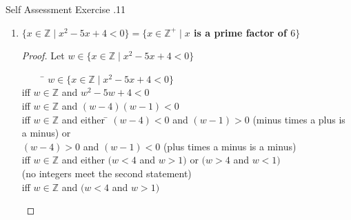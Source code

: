 \documentclass[../notes.tex]{subfiles}
\begin{document}
\begin{exercise}{Self Assessment Exercise \thechapter.11}
\begin{enumerate}
\begin{proof}
							Let $y \in \{x \in \mathbb{R} \mid x^{2} + 6x + 5 < 0\}$
							\begin{tabbing}
								$\qquad$ \= $y \in \{x \in \mathbb{R} \mid x^{2} + 6x + 5 < 0\}$\\
								iff \> $y \in \mathbb{R}$ and $y^{2} + 6y + 5< 0$\\
								iff \> $y \in \mathbb{R}$ and $(y + 5)(y + 1) < 0$\\
								iff \> $y \in \mathbb{R}$ and either \= $(y + 5) < 0$ and $(y + 1) > 0$ (minus times a plus is a minus) or\\
								\> \> $(y + 5) > 0$ and $(y + 1) < 0$ (plus times a minus is a minus)\\
								iff \> $y \in \mathbb{R}$ and either $(y < -5$ and $y > -1)$ or $(y > -5$ and $y < -1)$\\
								\> \> (no real numbers meet the first statement)\\
								iff \> $y \in \mathbb{R}$ and $(y > -5$ and $y < -1)$\\
								iff \> $y \in \mathbb{R}$ and $-5 < y < -1$\\
								iff \> $y \in \{x \in \mathbb{R} \mid -5 < x < -1\}$ \` \qedhere
							\end{tabbing}
						\end{proof}
						\pagebreak
					\item \textbf{$\{x \in \mathbb{Z} \mid x^{2} - 5x + 4 < 0\} = \{x \in \mathbb{Z}^{+} \mid x$ is a prime factor of $6\}$}
						\begin{proof}
							Let $w \in \{x \in \mathbb{Z} \mid x^{2} - 5x + 4 < 0\}$
							\begin{tabbing}
								$\qquad$ \= $w \in \{x \in \mathbb{Z} \mid x^{2} - 5x + 4 < 0\}$\\
								iff \> $w \in \mathbb{Z}$ and $w^{2} - 5w + 4 < 0$\\
								iff \> $w \in \mathbb{Z}$ and $(w - 4)(w - 1) < 0$\\
								iff \> $w \in \mathbb{Z}$ and either \= $(w - 4) < 0$ and $(w - 1) > 0$ (minus times a plus is a minus) or\\
								\> \> $(w - 4) > 0$ and $(w - 1) < 0$ (plus times a minus is a minus)\\
								iff \> $w \in \mathbb{Z}$ and either $(w < 4$ and $w > 1)$ or $(w > 4$ and $w < 1)$\\
								\> \> (no integers meet the second statement)\\
								iff \> $w \in \mathbb{Z}$ and $(w < 4$ and $w > 1)$\\

\end{tabbing}
\end{proof}
\end{enumerate}
\end{exercise}
\end{document}
